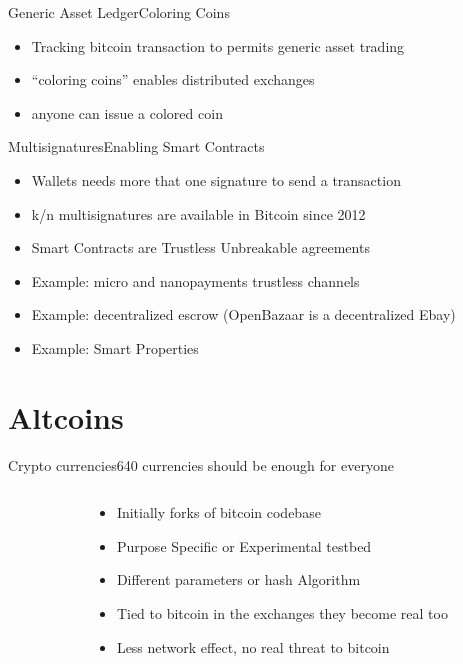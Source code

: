 \documentclass[english,compress]{beamer}
\begin{document}
\begin{frame}{Generic Asset Ledger}{Coloring Coins}
\begin{itemize}
\item Tracking bitcoin transaction to permits generic asset trading
\item ``coloring coins'' enables distributed exchanges
\item anyone can issue a colored coin
\end{itemize}
\vfill
{}
\end{frame}


\begin{frame}{Multisignatures}{Enabling Smart Contracts}
\begin{itemize}
\item Wallets needs more that one signature to send a transaction
\item k/n multisignatures are available in Bitcoin since 2012
\item Smart Contracts are Trustless Unbreakable agreements
\item Example: micro and nanopayments trustless channels
\item Example: decentralized escrow (OpenBazaar is a decentralized Ebay)
\item Example: Smart Properties
\end{itemize}

\end{frame}

\section{Altcoins}


\begin{frame}{Crypto currencies}{640 currencies should be enough for everyone}
 \begin{columns}
  \begin{column}{0.5 \textwidth}
  \end{column}
  
 \begin{column}{0.4 \textwidth}
   \begin{itemize}
    \item Initially forks of bitcoin codebase
    \item Purpose Specific or Experimental testbed
    \item Different parameters or hash Algorithm
    \item Tied to bitcoin in the exchanges they become real too
    \item Less network effect, no real threat to bitcoin
   \end{itemize}
  \end{column}
  \hfill
  \end{columns}
\end{frame}
\end{document}
